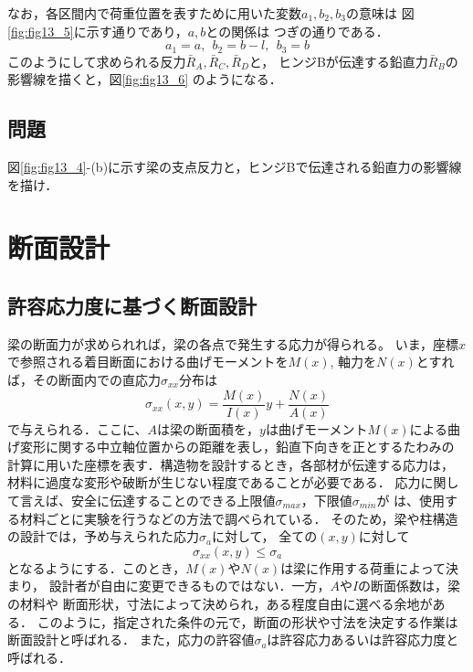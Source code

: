 \documentclass[10pt,a4j]{jarticle}
\begin{document}
なお，各区間内で荷重位置を表すために用いた変数$a_1,b_2, b_3$の意味は
図\ref{fig:fig13_5}に示す通りであり，$a,b$との関係は
つぎの通りである．
\begin{equation}
	a_1=a, \ \ b_2=b-l, \ \ b_3=b
\end{equation}
このようにして求められる反力$\bar R_A, \bar R_C,\bar R_D$と，
ヒンジBが伝達する鉛直力$\bar{R}_B$の影響線を描くと，図\ref{fig:fig13_6}
のようになる．
\subsection{問題}
図\ref{fig:fig13_4}-(b)に示す梁の支点反力と，ヒンジBで伝達される鉛直力の影響線を描け．
\section{断面設計}
\subsection{許容応力度に基づく断面設計}
梁の断面力が求められれば，梁の各点で発生する応力が得られる。
いま，座標$x$で参照される着目断面における曲げモーメントを$M(x)$, 
軸力を$N(x)$とすれば，その断面内での直応力$\sigma_{xx}$分布は
\begin{equation}
	\sigma_{xx}(x,y)=\frac{M(x)}{I(x)}y+\frac{N(x)}{A(x)}
\end{equation}
で与えられる．ここに、$A$は梁の断面積を，$y$は曲げモーメント$M(x)$による曲
げ変形に関する中立軸位置からの距離を表し，鉛直下向きを正とするたわみの
計算に用いた座標を表す．構造物を設計するとき，各部材が伝達する応力は，
材料に過度な変形や破断が生じない程度であることが必要である．
応力に関して言えば、安全に伝達することのできる上限値$\sigma_{max}$，下限値$\sigma_{min}$が
は、使用する材料ごとに実験を行うなどの方法で調べられている．
そのため，梁や柱構造の設計では，予め与えられた応力$\sigma_a$に対して，
全ての$(x,y)$に対して
\begin{equation}
	\sigma_{xx}(x,y) \leq \sigma_a
	\label{eqn:sxx_siga}
\end{equation}
となるようにする．このとき，$M(x)$や$N(x)$は梁に作用する荷重によって決まり，
設計者が自由に変更できるものではない．一方，$A$や$I$の断面係数は，梁の材料や
断面形状，寸法によって決められ，ある程度自由に選べる余地がある．
このように，指定された条件の元で，断面の形状や寸法を決定する作業は断面設計と呼ばれる．
また，応力の許容値$\sigma_a$は許容応力あるいは許容応力度と呼ばれる．
\end{document}
